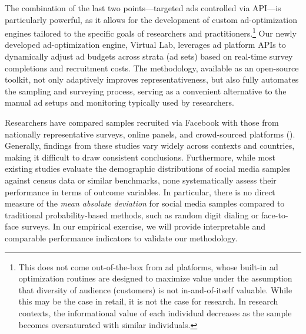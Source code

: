 The combination of the last two points---targeted ads controlled via API---is particularly powerful, as it allows for the development of custom ad-optimization engines tailored to the specific goals of researchers and practitioners.\footnote{This does not come out-of-the-box from ad platforms, whose built-in ad optimization routines are designed to maximize value under the assumption that diversity of audience (customers) is not in-and-of-itself valuable. While this may be the case in retail, it is not the case for research. In research contexts, the informational value of each individual decreases as the sample becomes oversaturated with similar individuals.} 
Our newly developed ad-optimization engine, Virtual Lab, leverages ad platform APIs to dynamically adjust ad budgets across strata (ad sets) based on real-time survey completions and recruitment costs. The methodology, available as an open-source toolkit, not only adaptively improves representativeness, but also fully automates the sampling and surveying process, serving as a convenient alternative to the manual ad setups and monitoring typically used by researchers.

Researchers have compared samples recruited via Facebook with those from nationally representative surveys, online panels, and crowd-sourced platforms (\citealt{samuels2013using,rosenzweig2020survey,beam2023social,neundorf2023improve}). Generally, findings from these studies vary widely across contexts and countries, making it difficult to draw consistent conclusions. Furthermore, while most existing studies evaluate the demographic distributions of social media samples against census data or similar benchmarks, none systematically assess their performance in terms of outcome variables. In particular, there is no direct measure of the \textit{mean absolute deviation} for social media samples compared to traditional probability-based methods, such as random digit dialing or face-to-face surveys. In our empirical exercise, we will provide interpretable and comparable performance indicators to validate our methodology.


